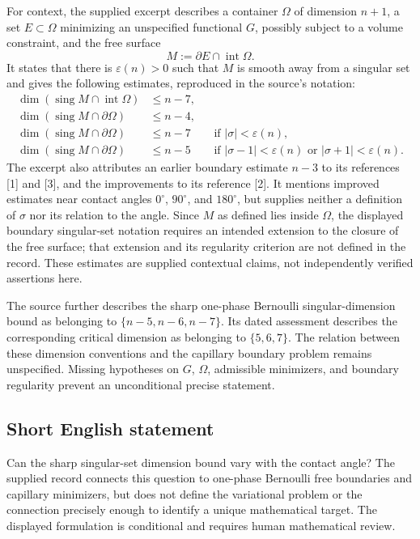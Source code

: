 \documentclass[11pt]{article}
\begin{document}
For context, the supplied excerpt describes a container \(\Omega\) of dimension \(n+1\), a set \(E\subset\Omega\) minimizing an unspecified functional \(G\), possibly subject to a volume constraint, and the free surface
\[
M:=\partial E\cap\operatorname{int}\Omega.
\]
It states that there is \(\varepsilon(n)>0\) such that \(M\) is smooth away from a singular set and gives the following estimates, reproduced in the source's notation:
\[
\begin{aligned}
\dim(\operatorname{sing}M\cap\operatorname{int}\Omega)&\le n-7,\\
\dim(\operatorname{sing}M\cap\partial\Omega)&\le n-4,\\
\dim(\operatorname{sing}M\cap\partial\Omega)&\le n-7
&&\text{if }|\sigma|<\varepsilon(n),\\
\dim(\operatorname{sing}M\cap\partial\Omega)&\le n-5
&&\text{if }|\sigma-1|<\varepsilon(n)
\text{ or }|\sigma+1|<\varepsilon(n).
\end{aligned}
\]
The excerpt also attributes an earlier boundary estimate \(n-3\) to its references [1] and [3], and the improvements to its reference [2]. It mentions improved estimates near contact angles \(0^\circ\), \(90^\circ\), and \(180^\circ\), but supplies neither a definition of \(\sigma\) nor its relation to the angle. Since \(M\) as defined lies inside \(\Omega\), the displayed boundary singular-set notation requires an intended extension to the closure of the free surface; that extension and its regularity criterion are not defined in the record. These estimates are supplied contextual claims, not independently verified assertions here.

The source further describes the sharp one-phase Bernoulli singular-dimension bound as belonging to \(\{n-5,n-6,n-7\}\). Its dated assessment describes the corresponding critical dimension as belonging to \(\{5,6,7\}\). The relation between these dimension conventions and the capillary boundary problem remains unspecified. Missing hypotheses on \(G\), \(\Omega\), admissible minimizers, and boundary regularity prevent an unconditional precise statement.
\subsection{Short English statement}
Can the sharp singular-set dimension bound vary with the contact angle? The supplied record connects this question to one-phase Bernoulli free boundaries and capillary minimizers, but does not define the variational problem or the connection precisely enough to identify a unique mathematical target. The displayed formulation is conditional and requires human mathematical review.
\end{document}

